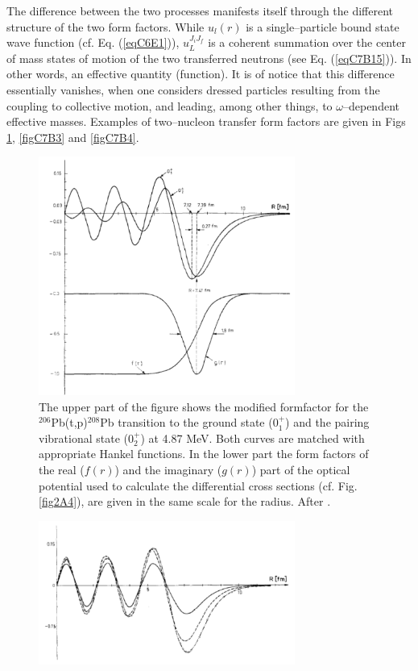 \begin{subappendices}
The difference between the two processes manifests itself through the different structure of the two form factors. While $u_l(r)$  is a single--particle bound state wave function (cf. Eq. (\ref{eqC6E1})), $u_L^{J_i J_f}$ is a coherent summation over the center of mass states of motion of the two transferred neutrons (see Eq. (\ref{eqC7B15})). In other words, an effective quantity (function). It is of notice that this difference essentially vanishes, when one considers dressed particles resulting from the coupling to collective motion, and leading, among other things, to $\omega$--dependent effective masses. Examples of two--nucleon transfer form factors are given in Figs \ref{figC7B2}, \ref{figC7B3} and \ref{figC7B4}.
 \begin{figure}[h!]
 	\begin{center}
\includegraphics*[width=0.75\textwidth]{C7/figs_C7/figC7B2}
\end{center}\caption{The upper part of the figure shows the modified formfactor for the $^{206}$Pb(t,p)$^{208}$Pb transition to the ground state ($0^+_1$) and the pairing vibrational state ($0^+_2$) at 4.87 MeV. Both curves are matched with appropriate 	Hankel functions. In the lower part the form factors of the real ($f(r)$) and the imaginary ($g(r)$) part of the optical potential used to calculate the differential cross sections (cf. Fig. \ref{fig2A4}), are given in the same scale for the radius. After \cite{Broglia:67}.}\label{figC7B2}
\end{figure}
 \begin{figure}[h!]
 	\begin{center}
\includegraphics*[width=0.75\textwidth]{C7/figs_C7/figC7B3}

\end{center}
\end{figure}
\end{subappendices}
